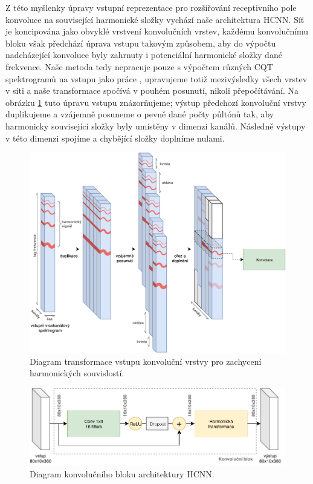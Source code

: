 Z této myšlenky úpravy vstupní reprezentace pro rozšiřování receptivního pole konvoluce na související harmonické složky vychází naše architektura HCNN. Síť je koncipována jako obvyklé vrstvení konvolučních vrstev, každému konvolučnímu bloku však předchází úprava vstupu takovým způsobem, aby do výpočtu nadcházející konvoluce byly zahrnuty i potenciální harmonické složky dané frekvence. Naše metoda tedy nepracuje pouze s výpočtem různých CQT spektrogramů na vstupu jako práce \cite{Bittner2017}, upravujeme totiž mezivýsledky všech vrstev v síti a naše transformace spočívá v pouhém posunutí, nikoli přepočítávání. Na obrázku \ref{obr:hcnn_harmonic_stacking} tuto úpravu vstupu znázorňujeme; výstup předchozí konvoluční vrstvy duplikujeme a vzájemně posuneme o pevně dané počty půltónů tak, aby harmonicky související složky byly umístěny  v dimenzi kanálů. Následně výstupy v této dimenzi spojíme a chybějící složky doplníme nulami.
\begin{figure}[h]\centering
    \includegraphics[width=\textwidth,height=\textheight,keepaspectratio]{../img/hcnn_harmonic_stacking_2}
\caption{Diagram transformace vstupu konvoluční vrstvy pro zachycení harmonických souvislostí.}\label{obr:hcnn_harmonic_stacking}
\end{figure}

\begin{figure}[h]\centering
    \includegraphics[width=\textwidth,height=\textheight,keepaspectratio]{../img/hcnn_layer}
\caption{Diagram konvolučního bloku architektury HCNN.}\label{obr:hcnn_layer}
\end{figure}

